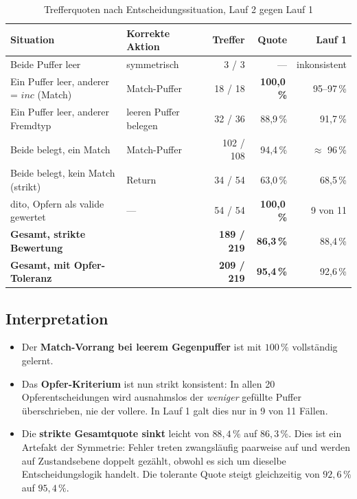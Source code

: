 \documentclass[11pt,a4paper]{article}
\begin{document}
\begin{table}[htbp]
\centering
\caption{Trefferquoten nach Entscheidungssituation, Lauf 2 gegen Lauf 1}
\label{tab:policy}
\small
\begin{tabularx}{\textwidth}{@{}LlrrR@{}}
\toprule
\textbf{Situation} & \textbf{Korrekte Aktion} & \textbf{Treffer} &
\textbf{Quote} & \textbf{Lauf 1} \\
\midrule
Beide Puffer leer & symmetrisch & 3 / 3 & --- & inkonsistent \\
Ein Puffer leer, anderer = $inc$ (Match) & Match-Puffer & 18 / 18 & \textbf{100,0\,\%} & 95--97\,\% \\
Ein Puffer leer, anderer Fremdtyp & leeren Puffer belegen & 32 / 36 & 88,9\,\% & 91,7\,\% \\
Beide belegt, ein Match & Match-Puffer & 102 / 108 & 94,4\,\% & $\approx$ 96\,\% \\
Beide belegt, kein Match (strikt) & Return & 34 / 54 & 63,0\,\% & 68,5\,\% \\
\quad dito, Opfern als valide gewertet & --- & 54 / 54 & \textbf{100,0\,\%} & 9 von 11 \\
\midrule
\textbf{Gesamt, strikte Bewertung} & & \textbf{189 / 219} & \textbf{86,3\,\%} & 88,4\,\% \\
\textbf{Gesamt, mit Opfer-Toleranz} & & \textbf{209 / 219} & \textbf{95,4\,\%} & 92,6\,\% \\
\bottomrule
\end{tabularx}
\end{table}

\subsection*{Interpretation}

\begin{itemize}[leftmargin=1.4em]
  \item Der \textbf{Match-Vorrang bei leerem Gegenpuffer} ist mit
        $100\,\%$ vollständig gelernt.
  \item Das \textbf{Opfer-Kriterium} ist nun strikt konsistent: In allen
        20 Opferentscheidungen wird ausnahmslos der \emph{weniger} gefüllte
        Puffer überschrieben, nie der vollere. In Lauf 1 galt dies nur in
        9 von 11 Fällen.
  \item Die \textbf{strikte Gesamtquote sinkt} leicht von $88{,}4\,\%$ auf
        $86{,}3\,\%$. Dies ist ein Artefakt der Symmetrie: Fehler treten
        zwangsläufig paarweise auf und werden auf Zustandsebene doppelt
        gezählt, obwohl es sich um dieselbe Entscheidungslogik handelt.
        Die tolerante Quote steigt gleichzeitig von $92{,}6\,\%$ auf
        $95{,}4\,\%$.
\end{itemize}
\end{document}

